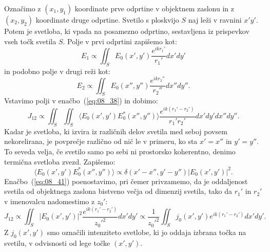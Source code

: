 Označimo z $(x_1, y_1)$ koordinate prve odprtine v objektnem zaslonu in z $(x_2, y_2)$
koordinate druge odprtine. Svetilo s ploskvijo $S$ naj leži v ravnini $x'y'$. Potem je svetloba, 
ki vpada na posamezno odprtino, sestavljena iz prispevkov vseh točk svetila $S$. Polje v prvi
odprtini zapišemo kot:
\begin{equation}
E_1 \propto \iint_S E_0(x',y') \frac{e^{ikr_1'}}{r_1'}dx'dy'
\label{eq:08_39}
\end{equation}
in podobno polje v drugi reži kot:
\begin{equation}
E_2 \propto \iint_S E_0(x'',y'') \frac{e^{ikr_2''}}{r_2''}dx''dy''.
\label{eq:08_40}
\end{equation}
Vstavimo polji v enačbo~(\ref{eq:08_38}) in dobimo:
\begin{equation}
J_{12} \propto \iint_S \iint_S \langle E_0(x',y') E_0^*(x'',y'') \rangle  \frac{e^{ik(r_1'-r_2')}}{r_1'r_2'}dx'dy'dx''dy''.
\label{eq:08_41}
\end{equation}
Kadar je svetloba, ki izvira iz različnih delov svetila med seboj povsem nekorelirana,
je povprečje različno od nič le v primeru, ko sta $x'=x''$ in $y'=y''$. To seveda velja, 
če svetilo samo po sebi ni prostorsko koherentno, denimo termična svetloba zvezd.
Zapišemo:
\begin{equation}
\langle E_0(x',y') E_0^*(x'',y'') \rangle \propto \delta(x'-x'', y'-y'') |E_0(x',y')|^2.
\label{eq:08_42}
\end{equation}
Enačbo~(\ref{eq:08_41}) poenostavimo, pri čemer privzamemo, da je oddaljenost svetila od 
objektnega zaslona bistveno večja od dimenzij svetila, tako da $r_1'$ in $r_2'$ v imenovalcu 
nadomestimo z $z_0'$:
\begin{equation}
J_{12} \propto \iint_S |E_0(x',y')|^2 \frac{e^{ik(r_1'-r_2')}}{z_0'^2}dx'dy'
\propto \frac{1}{z_0'^2}\iint_S j_0(x',y') e^{ik(r_1'-r_2')}dx'dy'.
\label{eq:08_43}
\end{equation}
Z $j_0(x',y')$ smo označili intenziteto svetlobe, ki jo oddaja izbrana točka na svetilu, 
v odvisnosti od lege točke $(x',y')$.

